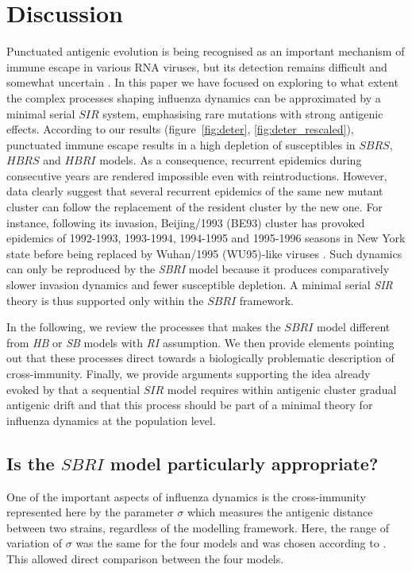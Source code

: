 \clearpage


\section{Discussion}

Punctuated antigenic evolution is being recognised as an important
mechanism of immune escape in various RNA viruses, but its detection
remains difficult and somewhat uncertain \citep{Cobey2008}. In this
paper we have focused on exploring to what extent the complex
processes shaping influenza dynamics can be approximated by a minimal
serial $SIR$ system, emphasising rare mutations with strong antigenic
effects. According to our results (figure~\ref{fig:deter},
\ref{fig:deter_rescaled}), punctuated immune escape results in a high
depletion of susceptibles in $SBRS$, $HBRS$ and $HBRI$ models. As a
consequence, recurrent epidemics during consecutive years are rendered
impossible even with reintroductions. However, data clearly suggest
that several recurrent epidemics of the same new mutant cluster can
follow the replacement of the resident cluster by the new one. For
instance, following its invasion, Beijing/1993 (BE93) cluster has
provoked epidemics of 1992-1993, 1993-1994, 1994-1995 and 1995-1996
seasons in New York state before being replaced by Wuhan/1995
(WU95)-like viruses \citep{Rambaut2008}. Such dynamics can only be
reproduced by the \textit{SBRI} model because it produces
comparatively slower invasion dynamics and fewer susceptible
depletion. A minimal serial \textit{SIR} theory is thus supported only
within the $SBRI$ framework.

In the following, we review the processes that makes the $SBRI$ model
different from \textit{HB} or \textit{SB} models with \textit{RI}
assumption. We then provide elements pointing out that these processes
direct towards a biologically problematic description of
cross-immunity. Finally, we provide arguments supporting the idea
already evoked by \citet{Koelle2006} that a sequential $SIR$ model
requires within antigenic cluster gradual antigenic drift and that
this process should be part of a minimal theory for influenza dynamics
at the population level.

\subsection{Is the $SBRI$ model particularly appropriate?}

One of the important aspects of influenza dynamics is the
cross-immunity represented here by the parameter $\sigma$ which
measures the antigenic distance between two strains, regardless of the
modelling framework. Here, the range of variation of $\sigma$ was the
same for the four models and was chosen according to
\citet{Koelle2006}. This allowed direct comparison between the four
models.

